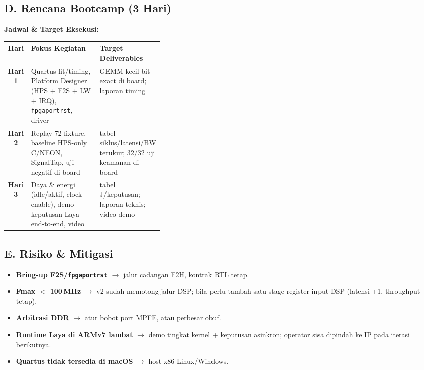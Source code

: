 \documentclass[10pt]{article}
\newcommand{\hd}[1]{\cellcolor{thg}\textbf{#1}}
\newcommand{\code}[1]{\texttt{\small #1}}
\begin{document}
\subsection*{D. Rencana Bootcamp (3 Hari)}
\textbf{Jadwal \& Target Eksekusi:}

{\small
\begin{tabularx}{\linewidth}{|c|L|p{0.36\linewidth}|}
\hline
\hd{Hari} & \hd{Fokus Kegiatan} & \hd{Target Deliverables} \\ \hline
\textbf{Hari 1} & Quartus fit/timing, Platform Designer (HPS + F2S + LW + IRQ), \code{fpgaportrst}, driver & GEMM kecil bit-exact di board; laporan timing \\ \hline
\textbf{Hari 2} & Replay 72 fixture, baseline HPS-only C/NEON, SignalTap, uji negatif di board & tabel siklus/latensi/BW terukur; 32/32 uji keamanan di board \\ \hline
\textbf{Hari 3} & Daya \& energi (idle/aktif, clock enable), demo keputusan Laya end-to-end, video & tabel J/keputusan; laporan teknis; video demo \\ \hline
\end{tabularx}}

\subsection*{E. Risiko \& Mitigasi}
\begin{itemize}
\item \textbf{Bring-up F2S/\code{fpgaportrst}} $\rightarrow$ jalur cadangan F2H, kontrak RTL tetap.
\item \textbf{Fmax $<$ 100\,MHz} $\rightarrow$ v2 sudah memotong jalur DSP; bila perlu tambah satu stage register input DSP (latensi +1, throughput tetap).
\item \textbf{Arbitrasi DDR} $\rightarrow$ atur bobot port MPFE, atau perbesar obuf.
\item \textbf{Runtime Laya di ARMv7 lambat} $\rightarrow$ demo tingkat kernel + keputusan asinkron; operator sisa dipindah ke IP pada iterasi berikutnya.
\item \textbf{Quartus tidak tersedia di macOS} $\rightarrow$ host x86 Linux/Windows.
\end{itemize}
\end{document}
